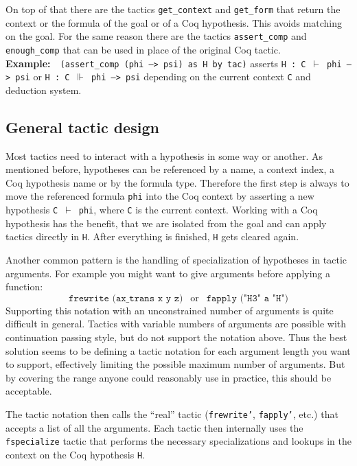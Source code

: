 \documentclass[12pt, a4paper]{article}
\newcommand{\coq}[1]{\texttt{#1}}
\newcommand{\example}[1]{\medskip\\\textbf{Example:}~~#1}
\begin{document}
\medskip\noindent
On top of that there are the tactics \texttt{get\_context} and \texttt{get\_form} that return the context or the formula of the goal or of a Coq hypothesis.
This avoids matching on the goal.
For the same reason there are the tactics \texttt{assert\_comp} and \texttt{enough\_comp} that can be used in place of the original Coq tactic.
\example{\coq{(assert_comp (phi --> psi) as H by tac)} asserts \texttt{H : C $\vdash$ phi --> psi} or \texttt{H : C $\Vdash$ phi --> psi} depending on the current context \texttt{C} and deduction system.}



\subsection{General tactic design}

Most tactics need to interact with a hypothesis in some way or another.
As mentioned before, hypotheses can be referenced by a name, a context index, a Coq hypothesis name or by the formula type.
Therefore the first step is always to move the referenced formula \texttt{phi} into the Coq context by asserting a new hypothesis \texttt{C $\vdash$ phi}, where \texttt{C} is the current context.
Working with a Coq hypothesis has the benefit, that we are isolated from the goal and can apply tactics directly in \texttt{H}.
After everything is finished, \texttt{H} gets cleared again.

\medskip\noindent
Another common pattern is the handling of specialization of hypotheses in tactic arguments.
For example you might want to give arguments before applying a function:
$$\coq{frewrite (ax_trans x y z)} ~~\text{ or }~~ \coq{fapply ("H3" a "H")}$$
Supporting this notation with an unconstrained number of arguments is quite difficult in general.
Tactics with variable numbers of arguments are possible with continuation passing style, but do not support the notation above.
Thus the best solution seems to be defining a tactic notation for each argument length you want to support, effectively limiting the possible maximum number of arguments.
But by covering the range anyone could reasonably use in practice, this should be acceptable.

The tactic notation then calls the \enquote{real} tactic (\texttt{frewrite'}, \texttt{fapply'}, etc.) that accepts a list of all the arguments.
Each tactic then internally uses the \texttt{fspecialize} tactic that performs the necessary specializations and lookups in the context on the Coq hypothesis \texttt{H}.
\end{document}
